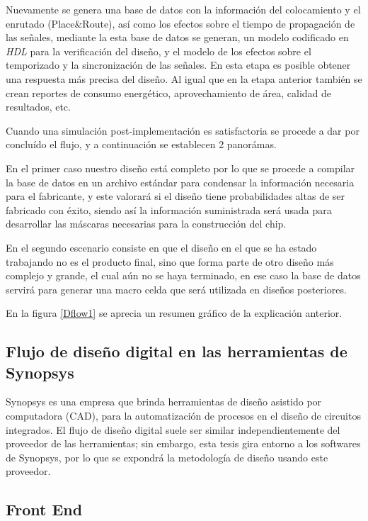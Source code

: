 {Nuevamente se genera una base de datos con la información del colocamiento y el enrutado (Place\&Route), así como los efectos sobre el tiempo de propagación de las señales, mediante la esta base de datos se generan, un modelo codificado en \textit{HDL} para la verificación del diseño, y el modelo de los efectos sobre el temporizado y la sincronización de las señales. En esta etapa es posible obtener una respuesta más precisa del diseño. Al igual que en la etapa anterior también se crean reportes de consumo energético, aprovechamiento de área, calidad de resultados, etc.

Cuando una simulación post-implementación es satisfactoria se procede a dar por concluído el flujo, y a continuación se establecen 2 panorámas.

En el primer caso nuestro diseño está completo por lo que se procede a compilar la base de datos en un archivo estándar para condensar la información necesaria para el fabricante, y este valorará si el diseño tiene probabilidades altas de ser fabricado con éxito, siendo así la información suministrada será usada para desarrollar las máscaras necesarias para la construcción del chip.

En el segundo escenario consiste en que el diseño en el que se ha estado trabajando no es el producto final, sino que forma parte de otro diseño más complejo y grande, el cual aún no se haya terminado, en ese caso la base de datos servirá para generar una macro celda que será utilizada en diseños posteriores.

En la figura \ref{Dflow1} se aprecia un resumen gráfico de la explicación anterior.

\subsection{Flujo de diseño digital en las herramientas de Synopsys}

Synopsys es una empresa que brinda herramientas de diseño asistido por computadora (CAD), para la automatización de procesos en el diseño de circuitos integrados. El flujo de diseño digital suele ser similar independientemente del proveedor de las herramientas; sin embargo, esta tesis gira entorno a los softwares de Synopsys, por lo que se expondrá la metodología de diseño usando este proveedor.

\subsection{Front End}

}
